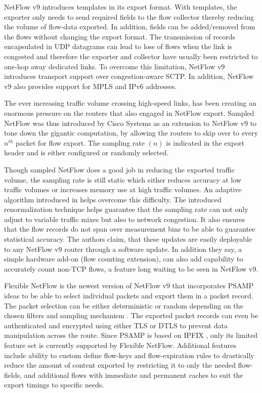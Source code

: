 NetFlow v$9$ introduces templates in its export format. With templates, the exporter only needs to send required fields to the flow collector thereby reducing the volume of flow-data exported. In addition, fields can be added/removed from the flows without changing the export format. The transmission of records encapsulated in \ac{UDP} datagrams can lead to loss of flows when the link  is congested and therefore the exporter and collector have usually been restricted to one-hop away dedicated links. To overcome this limitation, NetFlow v$9$ introduces transport support over congestion-aware \ac{SCTP}. In addition, NetFlow v$9$ also provides support for \ac{MPLS} and \ac{IP}v$6$ addresses. 

The ever increasing traffic volume crossing high-speed links, has been creating an enormous pressure on the routers that also engaged in NetFlow export. Sampled NetFlow was thus introduced by Cisco Systems as an extension to NetFlow v$9$  to tone down the gigantic computation, by allowing the routers to skip over to every $n^{th}$ packet for flow export. The sampling rate $(n)$ is indicated in the export header and is either configured or randomly selected. 

Though sampled NetFlow does a good job in reducing the exported traffic volume, the sampling rate is still static which either reduces accuracy at low traffic volumes or increases memory use at high traffic volumes. An adaptive algorithm introduced in \cite{cestan:2004} helps overcome this difficulty. The introduced renormalization technique helps guarantee that  the sampling rate can not only adjust to variable traffic mixes but also to network congestion. It also ensures that the flow records do not span over measurement bins to be able to guarantee statistical accuracy. The authors claim, that these updates are easily deployable to any NetFlow v$9$ router through a software update. In addition they say, a simple hardware add-on (flow counting extension), can also add capability to accurately count non-\ac{TCP} flows, a feature long waiting to be seen in NetFlow v$9$.

Flexible NetFlow is the newest version of NetFlow v$9$ that incorporates \ac{PSAMP} \cite{rfc5474} ideas to be able to select individual packets and export them in a packet record. The packet selection can be either deterministic or random depending on the chosen filters and sampling mechanism \cite{rfc5475}. The exported packet records can even be authenticated and encrypted using either \ac{TLS} \cite{rfc5246} or \ac{DTLS} \cite{rfc4347}  to prevent data manipulation across the route. Since \ac{PSAMP} is based on \ac{IPFIX} \cite{rfc5476}, only its limited feature set is currently supported by Flexible NetFlow. Additional features include ability to custom define flow-keys and flow-expiration rules to drastically reduce the amount of content exported by restricting it to only the needed flow-fields, and additional flows with immediate and permanent caches to suit the export timings to specific needs.

